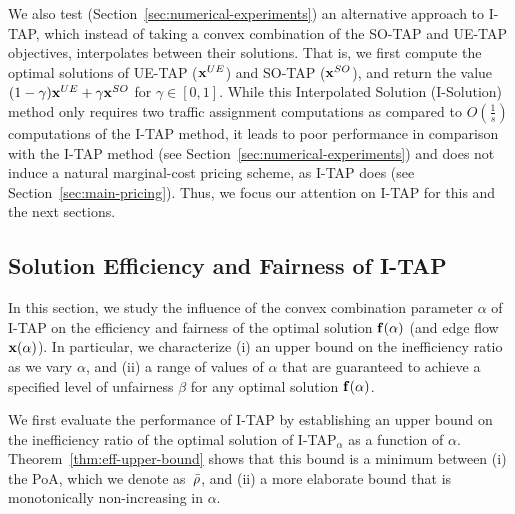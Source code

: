 \documentclass{article}
\newif\ifarxiv   %
\begin{document}
\fi 

We also test (Section~\ref{sec:numerical-experiments}) an alternative approach to I-TAP, which instead of taking a convex combination of the SO-TAP and UE-TAP objectives, interpolates between their solutions. That is, we first compute the optimal solutions of UE-TAP ($\mathbf{x}^{UE}$) and SO-TAP ($\mathbf{x}^{SO}$), and return the value $(1-\gamma) \mathbf{x}^{UE} + \gamma \mathbf{x}^{SO}$ for $\gamma \in [0,1]$. While this Interpolated Solution (I-Solution) method only requires two traffic assignment computations as compared to $O(\frac{1}{s})$ computations of the I-TAP method, it leads to poor performance in comparison with the I-TAP method (see Section~\ref{sec:numerical-experiments}) and does not induce a natural marginal-cost pricing scheme, as I-TAP does (see Section~\ref{sec:main-pricing}). Thus, we focus our attention on I-TAP for this and the next sections.




\subsection{Solution Efficiency and Fairness of I-TAP} \label{sec:eff-properties}

In this section, we study the influence of the convex combination parameter $\alpha$ of I-TAP on the efficiency and fairness of the optimal solution $\mathbf{f}(\alpha)$ (and edge flow $\mathbf{x}(\alpha)$). In particular, we characterize (i) an upper bound on the inefficiency ratio as we vary $\alpha$, and (ii) a range of values of $\alpha$ that are guaranteed to achieve a specified level of unfairness $\beta$ for any optimal solution $\mathbf{f}(\alpha)$.

\ifarxiv
We first evaluate the performance of I-TAP by establishing an upper bound on the inefficiency ratio as a function of $\alpha$. Theorem~\ref{thm:eff-upper-bound} shows that the upper bound of the inefficiency ratio $\rho(\x(\alpha))$ of the optimal traffic assignment of I-TAP$_{\alpha}$ is the minimum between two terms: (i) the Price of Anarchy (PoA) $\Bar{\rho}$, and (ii) a more elaborate bound that is monotonically non-increasing in $\alpha$.
\else
We first evaluate the performance of I-TAP by establishing an upper bound on the inefficiency ratio of the optimal solution of I-TAP$_{\alpha}$ as a function of $\alpha$. Theorem~\ref{thm:eff-upper-bound} shows that this bound is a minimum between (i) the PoA, which we denote as~$\Bar{\rho}$, and (ii) a more elaborate bound that is monotonically non-increasing in $\alpha$.
\fi
\end{document}
